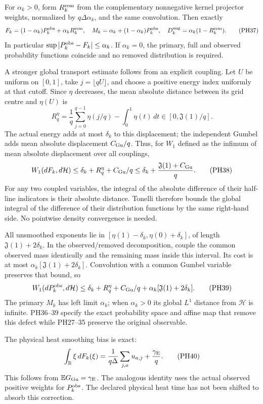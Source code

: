 \documentclass[10pt]{article}
\begin{document}
For \(\alpha_k>0\), form \(R_k^{\rm rem}\) from the complementary nonnegative kernel projector weights, normalized by \(q\Delta\alpha_k\), and the same convolution. Then exactly \[
 F_k=(1-\alpha_k)P_k^{\rm obs}+\alpha_kR_k^{\rm rem},
 \quad M_k=\alpha_k+(1-\alpha_k)P_k^{\rm obs},
 \quad D_k^{\rm ang}=\alpha_k(1-R_k^{\rm rem}).
 \tag{PH37}
\] In particular \(\sup|P_k^{\rm obs}-F_k|\le\alpha_k\). If \(\alpha_k=0\), the primary, full and observed probability functions coincide and no removed distribution is required.

A stronger global transport estimate follows from an explicit coupling. Let \(U\) be uniform on \([0,1]\), take \(j=\lfloor qU\rfloor\), and choose a positive energy index uniformly at that cutoff. Since \(\eta\) decreases, the mean absolute distance between its grid centre and \(\eta(U)\) is \[
 R_q^\eta=\frac1q\sum_{j=0}^{q-1}\eta(j/q)-\int_0^1\eta(t)\,dt
 \in[0,\mathfrak J(1)/q].
\] The actual energy adds at most \(\delta_k\) to this displacement; the independent Gumbel adds mean absolute displacement \(C_{\rm Gu}/q\). Thus, for \(W_1\) defined as the infimum of mean absolute displacement over all couplings, \[
 W_1(dF_k,d\mathcal H)
 \le\delta_k+R_q^\eta+C_{\rm Gu}/q
 \le\delta_k+\frac{\mathfrak J(1)+C_{\rm Gu}}q .
 \tag{PH38}
\] For any two coupled variables, the integral of the absolute difference of their half-line indicators is their absolute distance. Tonelli therefore bounds the global integral of the difference of their distribution functions by the same right-hand side. No pointwise density convergence is needed.

All unsmoothed exponents lie in \([\eta(1)-\delta_k,\eta(0)+\delta_k]\), of length \(\mathfrak J(1)+2\delta_k\). In the observed/removed decomposition, couple the common observed mass identically and the remaining mass inside this interval. Its cost is at most \(\alpha_k[\mathfrak J(1)+2\delta_k]\). Convolution with a common Gumbel variable preserves that bound, so \[
 W_1(dP_k^{\rm obs},d\mathcal H)
 \le\delta_k+R_q^\eta+C_{\rm Gu}/q+
 \alpha_k[\mathfrak J(1)+2\delta_k].
 \tag{PH39}
\] The primary \(M_k\) has left limit \(\alpha_k\); when \(\alpha_k>0\) its global \(L^1\) distance from \(\mathcal H\) is infinite. PH36--39 specify the exact probability space and affine map that remove this defect while PH27--35 preserve the original observable.

The physical heat smoothing bias is exact: \[
 \int_{\mathbb R}\xi\,dF_k(\xi)
 =\frac1{q\Delta}\sum_{j,a}u_{a,j}+\frac{\gamma_{\rm E}}q .
 \tag{PH40}
\] This follows from \(\mathbb EG_{\rm Gu}=\gamma_{\rm E}\). The analogous identity uses the actual observed positive weights for \(P_k^{\rm obs}\). The declared physical heat time has not been shifted to absorb this correction.
\end{document}
